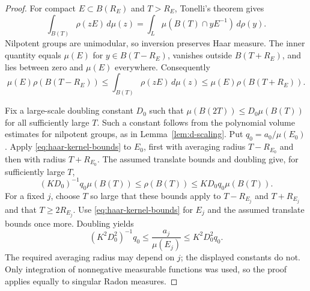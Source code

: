 \begin{proof}
For compact $E\subset B(R_E)$ and $T>R_E$, Tonelli's theorem gives
\[
 \int_{B(T)}\rho(zE)\,d\mu(z)
 =\int_L\mu(B(T)\cap yE^{-1})\,d\rho(y).
\]
Nilpotent groups are unimodular, so inversion preserves Haar
measure.  The inner quantity equals $\mu(E)$ for
$y\in B(T-R_E)$, vanishes outside $B(T+R_E)$, and lies between
zero and $\mu(E)$ everywhere.  Consequently
\begin{equation}
\label{eq:haar-kernel-bounds}
 \mu(E)\rho(B(T-R_E))
 \le \int_{B(T)}\rho(zE)\,d\mu(z)
 \le \mu(E)\rho(B(T+R_E)).
\end{equation}

Fix a large-scale doubling constant $D_0$ such that
$\mu(B(2T))\le D_0\mu(B(T))$ for all sufficiently large $T$.
Such a constant follows from the polynomial volume estimates for
nilpotent groups, as in Lemma~\ref{lem:d-scaling}.
Put $q_0=a_0/\mu(E_0)$.
Apply \eqref{eq:haar-kernel-bounds} to $E_0$, first with averaging
radius $T-R_{E_0}$ and then with radius $T+R_{E_0}$.
The assumed translate bounds and doubling give, for sufficiently
large $T$,
\[
 (KD_0)^{-1}q_0\mu(B(T))
 \le\rho(B(T))\le KD_0q_0\mu(B(T)).
\]
For a fixed $j$, choose $T$ so large that these bounds apply to
$T-R_{E_j}$ and $T+R_{E_j}$ and that $T\ge2R_{E_j}$.
Use \eqref{eq:haar-kernel-bounds} for $E_j$ and the assumed
translate bounds once more.  Doubling yields
\[
 (K^2D_0^2)^{-1}q_0
 \le\frac{a_j}{\mu(E_j)}
 \le K^2D_0^2q_0.
\]
The required averaging radius may depend on $j$; the displayed
constants do not.  Only integration of nonnegative measurable
functions was used, so the proof applies equally to singular
Radon measures.
\end{proof}

